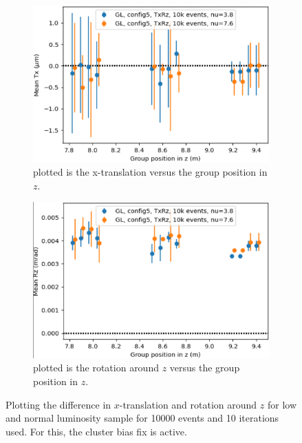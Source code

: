 \begin{figure}
  \centering
  \begin{subfigure}[b]{0.48\textwidth}
    \centering
    \includegraphics[width=\textwidth]{plots/jan_24_2022/tx_low_normal.png}
    \caption{plotted is the x-translation versus the group position in $z$.}
    \label{fig:compare_tx}
  \end{subfigure}
  \hfill
  \begin{subfigure}[b]{0.48\textwidth}
    \centering
    \includegraphics[width=\textwidth]{plots/jan_24_2022/rz_low_normal.png}
    \caption{plotted is the rotation around $z$ versus the group position in $z$.}
    \label{fig:compare_rz}
  \end{subfigure}
  \caption{Plotting the difference in $x$-translation and rotation around $z$ for low and normal luminosity sample for 10000 events and 10 iterations used. For this, the cluster bias fix is active.}
  \label{fig:lumi_low_normal_hack_on}
\end{figure}

